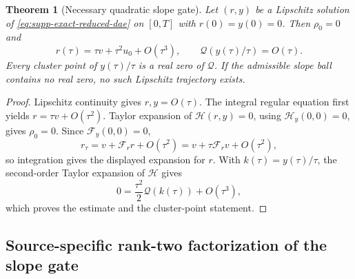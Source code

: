 \documentclass[11pt]{article}
\newtheorem{theorem}{Theorem}[section]
\numberwithin{equation}{section}
\theoremstyle{definition}
\theoremstyle{remark}
\begin{document}
\begin{theorem}[Necessary quadratic slope gate]
\label{thm:supp-exact-slope-gate}
Let $(r,y)$ be a Lipschitz solution of
\eqref{eq:supp-exact-reduced-dae} on $[0,T]$ with
$r(0)=y(0)=0$.  Then $\rho_0=0$ and
\begin{equation}
 r(\tau)=\tau v+\tau^2u_0+O(\tau^3),
 \qquad
 \mathcal Q\!\left(y(\tau)/\tau\right)=O(\tau).
 \label{eq:supp-exact-slope-estimate}
\end{equation}
Every cluster point of $y(\tau)/\tau$ is a real zero of $\mathcal Q$.
If the admissible slope ball contains no real zero, no such Lipschitz
trajectory exists.
\end{theorem}
\begin{proof}
Lipschitz continuity gives $r,y=O(\tau)$.  The integral regular equation
first yields $r=\tau v+O(\tau^2)$.  Taylor expansion of
$\mathcal H(r,y)=0$, using $\mathcal H_y(0,0)=0$, gives
$\rho_0=0$.  Since $\mathcal F_y(0,0)=0$,
\[
 r_\tau=v+\mathcal F_r r+O(\tau^2)
       =v+\tau\mathcal F_rv+O(\tau^2),
\]
so integration gives the displayed expansion for $r$.  With
$k(\tau)=y(\tau)/\tau$, the second-order Taylor expansion of
$\mathcal H$ gives
\[
 0=\frac{\tau^2}{2}\mathcal Q(k(\tau))+O(\tau^3),
\]
which proves the estimate and the cluster-point statement.
\end{proof}


\subsection{Source-specific rank-two factorization of the slope gate}
\label{subsec:supp-exact-rank-two-slope}
\end{document}
